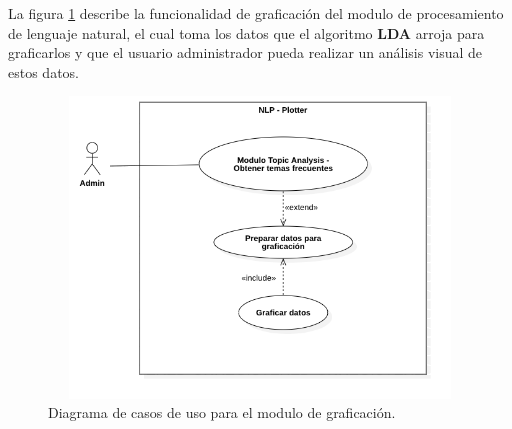         La figura \ref{fig:cu-nlp-g} describe la funcionalidad de graficación del modulo de procesamiento de lenguaje natural, el cual toma los datos que el algoritmo \textbf{LDA} arroja para graficarlos y que el usuario administrador pueda realizar un análisis visual de estos datos.
        \begin{figure}[H]
             \centering
             \includegraphics[height=8cm, width=16.5cm]{Latex/Classes/Imagenes/NLP_Plotter.png}
             \caption{Diagrama de casos de uso para el modulo de graficación.}
             \label{fig:cu-nlp-g}
        \end{figure}

